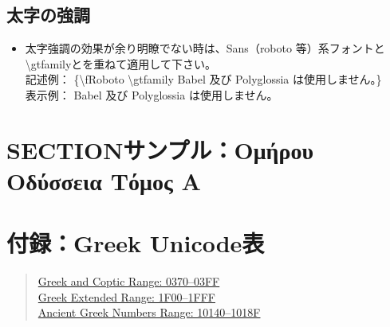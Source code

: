 \documentclass[a4paper,10pt]{ltjsarticle}
\def\colH#1{\color[HTML]{#1}}
\def\bs{\textbackslash }
\begin{document}
\subsection{太字の強調}  
\begin{itemize}
  \item 太字強調の効果が余り明瞭でない時は、Sans（roboto 等）系フォントと \bs gtfamilyとを重ねて適用して下さい。\\
記述例： \{{\colH{800000}\bs fRoboto \bs gtfamily} Babel 及び Polyglossia は使用しません。\}\\
表示例： {\fRoboto \gtfamily Babel 及び Polyglossia は使用しません。}
\end{itemize}

\section{SECTIONサンプル：{\fCmuntt Ομήρου Οδύσσεια Τόμος Α}}  

\section{付録：Greek Unicode表}\vspace{-2mm}
\begin{quote}
\noindent\href{https://www.unicode.org/charts/PDF/U0370.pdf}{Greek and Coptic Range: 0370–03FF}\\
\href{https://www.unicode.org/charts/PDF/U1F00.pdf}{Greek Extended Range: 1F00–1FFF}\\
\href{https://www.unicode.org/charts/PDF/U10140.pdf}{Ancient Greek Numbers Range: 10140–1018F}\\
\end{quote}
\end{document}
